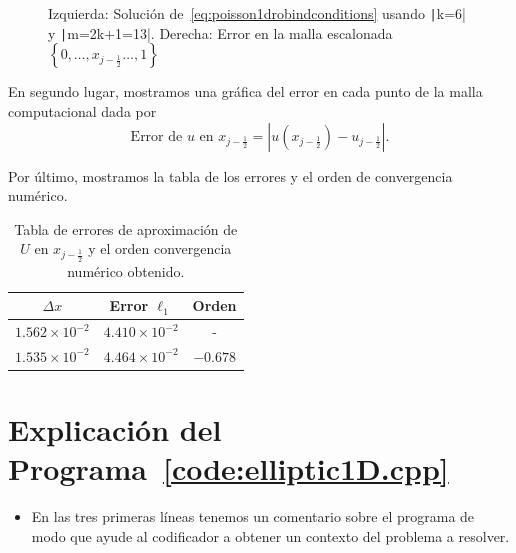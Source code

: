 \begin{problem}
\begin{figure}[ht!]
      \caption{Izquierda: Solución de~\eqref{eq:poisson1drobindconditions}
            usando \texttt|k=6| y \texttt|m=2k+1=13|.
            Derecha: Error en la malla escalonada
            \begin{math}
                  \left\{
                  0,
                  \dotsc,
                  x_{j-\frac{1}{2}}
                  \dotsc,
                  1
                  \right\}
            \end{math}}
\end{figure}

En segundo lugar, mostramos una gráfica del error en cada punto de la malla computacional
dada por
\begin{equation*}
      \text{Error de $u$ en $x_{j-\frac{1}{2}}$}=
      \left|
      u\left(x_{j-\frac{1}{2}}\right)-
      u_{j-\frac{1}{2}}
      \right|.
\end{equation*}

Por último, mostramos la tabla de los errores y el orden de convergencia numérico.

\begin{table}[ht!]
      \centering
      \begin{tabular}{ccc}
            \toprule
            $\Delta x$            & Error $\ell_1$        & Orden    \\
            \midrule
            $1.562\times 10^{-2}$ & $4.410\times 10^{-2}$ & -        \\
            $1.535\times 10^{-2}$ & $4.464\times 10^{-2}$ & $-0.678$ \\
            \bottomrule
      \end{tabular}
      \caption{Tabla de errores de aproximación de $U$ en
            $x_{j-\frac{1}{2}}$ y el orden convergencia numérico obtenido.}
      \label{table:errors}
\end{table}


\section*{Explicación del Programa~\ref{code:elliptic1D.cpp}}

\begin{itemize}
      \item

            En las tres primeras líneas tenemos un comentario sobre el
            programa de modo que ayude al codificador a obtener un
            contexto del problema a resolver.


\end{itemize}
\end{problem}
